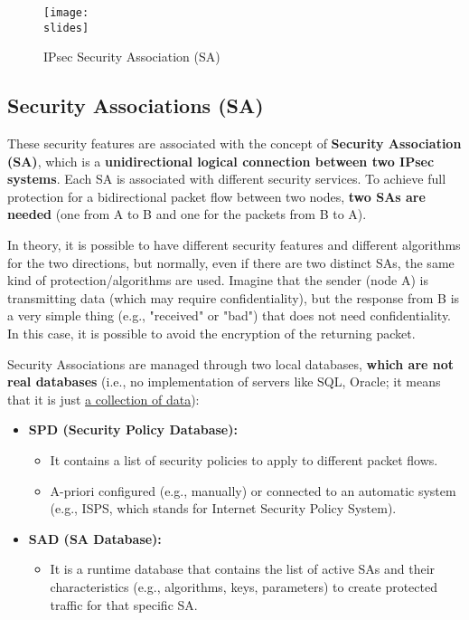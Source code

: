 \begin{figure}[h]
    \centering
    \texttt{[image: \\slides]}
    \caption{IPsec Security Association (SA)}
    \label{fig:ipsec-sa}
\end{figure}

\subsection{Security Associations (SA)}

These security features are associated with the concept of \textbf{Security Association (SA)}, which is a \textbf{unidirectional logical connection between two IPsec systems}. Each SA is associated with different security services. To achieve full protection for a bidirectional packet flow between two nodes, \textbf{two SAs are needed} (one from A to B and one for the packets from B to A).

In theory, it is possible to have different security features and different algorithms for the two directions, but normally, even if there are two distinct SAs, the same kind of protection/algorithms are used.
Imagine that the sender (node A) is transmitting data (which may require confidentiality), but the response from B is a very simple thing (e.g., "received" or "bad") that does not need confidentiality. In this case, it is possible to avoid the encryption of the returning packet.

Security Associations are managed through two local databases, \textbf{which are not real databases}
(i.e., no implementation of servers like SQL, Oracle; it means that it is just \ul{a collection of data}):


\begin{itemize}
    \item \textbf{SPD (Security Policy Database):}
          \begin{itemize}
              \item It contains a list of security policies to apply to different packet flows.
              \item A-priori configured (e.g., manually) or connected to an automatic system (e.g., ISPS, which stands for Internet Security Policy System).
          \end{itemize}
    \item \textbf{SAD (SA Database):}
          \begin{itemize}
              \item It is a runtime database that contains the list of active SAs and their characteristics (e.g., algorithms, keys, parameters) to create protected traffic for that specific SA.
          \end{itemize}
\end{itemize}

